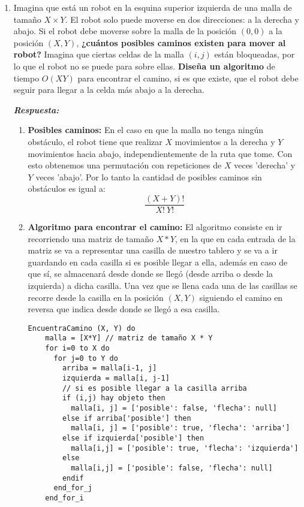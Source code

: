 \documentclass[11pt,letterpaper]{article}
\newcommand\respuesta{\textbf{\textit{Respuesta:}}}
\begin{document}
  \begin{enumerate}[leftmargin=*]
    \item Imagina que está un robot en la esquina superior izquierda de una malla de tamaño $X \times Y$. El robot solo puede moverse en dos direcciones: a la derecha y abajo. Si el robot debe moverse sobre la malla de la posición $(0,0)$ a la posición $(X,Y)$, \textbf{¿cuántos posibles caminos existen para mover al robot?} Imagina que ciertas celdas de la malla $(i,j)$ están bloqueadas, por lo que el robot no se puede para sobre ellas. \textbf{Diseña un algoritmo} de tiempo $O(XY)$ para encontrar el camino, si es que existe, que el robot debe seguir para llegar a la celda más abajo a la derecha.
    
    \respuesta
    \begin{enumerate}[label=\roman*)]
      \item \textbf{Posibles caminos:} En el caso en que la malla no tenga ningún obstáculo, el robot tiene que realizar $X$ movimientos a la derecha y $Y$ movimientos hacia abajo, independientemente de la ruta que tome. Con esto obtenemos una permutación con repeticiones de $X$ veces 'derecha' y $Y$ veces 'abajo'. Por lo tanto la cantidad de posibles caminos sin obstáculos es igual a:
      \[
        \frac{(X+Y)!}{X! \ Y!} 
      \]
      
      \item \textbf{Algoritmo para encontrar el camino:} El algoritmo consiste en ir recorriendo una matriz de tamaño $X*Y$, en la que en cada entrada de la matriz se va a representar una casilla de nuestro tablero y se va a ir guardando en cada casilla si es posible llegar a ella, además en caso de que sí, se almacenará desde donde se llegó (desde arriba o desde la izquierda) a dicha casilla. Una vez que se llena cada una de las casillas se recorre desde la casilla en la posición $(X,Y)$ siguiendo el camino en reversa que indica desde donde se llegó a esa casilla.
      
      \begin{lstlisting}[caption=Encontrar camino en matriz de $X\times Y$]
  EncuentraCamino (X, Y) do
    malla = [X*Y] // matriz de tamaño X * Y
    for i=0 to X do
      for j=0 to Y do
        arriba = malla[i-1, j]
        izquierda = malla[i, j-1]
        // si es posible llegar a la casilla arriba
        if (i,j) hay objeto then
          malla[i, j] = ['posible': false, 'flecha': null]
        else if arriba['posible'] then
          malla[i, j] = ['posible': true, 'flecha': 'arriba']
        else if izquierda['posible'] then
          malla[i,j] = ['posible': true, 'flecha': 'izquierda']
        else
          malla[i,j] = ['posible': false, 'flecha': null]
        endif
      end_for_j
    end_for_i
    

\end{lstlisting}
\end{enumerate}
\end{enumerate}
\end{document}
